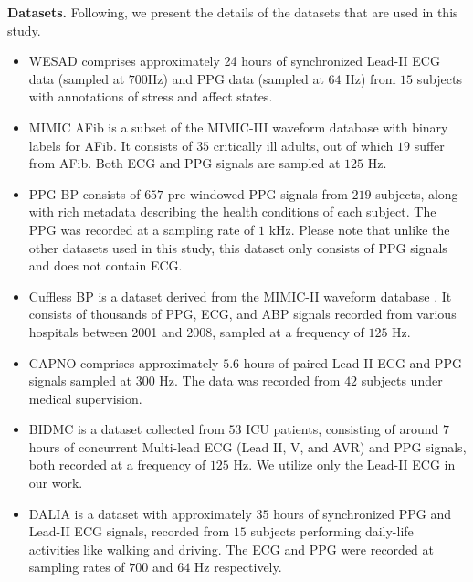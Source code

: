 \documentclass[letterpaper]{article} %
\begin{document}
\noindent\textbf{Datasets.} Following, we present the details of the datasets that are used in this study.

\begin{itemize}
    \item WESAD \citep{schmidt2018introducing} comprises approximately 24 hours of synchronized Lead-II ECG data (sampled at $700$Hz) and PPG data (sampled at $64$ Hz) from $15$ subjects with annotations of stress and affect states. %

    \item MIMIC AFib \cite{bashar2019noise} is a subset of the MIMIC-III waveform database \cite{johnson2016mimic} with binary labels for AFib. It consists of $35$ critically ill adults, out of which $19$ suffer from AFib. Both ECG and PPG signals are sampled at $125$ Hz. 

    \item PPG-BP \cite{liang2018new} consists of $657$ pre-windowed PPG signals from $219$ subjects, along with rich metadata describing the health conditions of each subject. The PPG was recorded at a sampling rate of $1$ kHz. Please note that unlike the other datasets used in this study, this dataset only consists of PPG signals and does not contain ECG.  %

    \item Cuffless BP \cite{kachuee2015cuff} is a dataset derived from the MIMIC-II waveform database \cite{saeed2011multiparameter}. It consists of thousands of PPG, ECG, and ABP signals recorded from various hospitals between 2001 and 2008, sampled at a frequency of $125$ Hz. %

    \item CAPNO \citep{karlen2021capnobase} comprises approximately $5.6$ hours of paired Lead-II ECG and PPG signals sampled at $300$ Hz. The data was recorded from $42$ subjects under medical supervision. 
    
    \item BIDMC \citep{pimentel2016toward} is a dataset collected from $53$ ICU patients, consisting of around $7$ hours of concurrent Multi-lead ECG (Lead II, V, and AVR) and PPG signals, both recorded at a frequency of $125$ Hz. We utilize only the Lead-II ECG in our work. 
    
    \item DALIA \citep{reiss2019deep} is a dataset with approximately $35$ hours of synchronized PPG and Lead-II ECG signals, recorded from $15$ subjects performing daily-life activities like walking and driving. The ECG and PPG were recorded at sampling rates of $700$ and $64$ Hz respectively. %

\end{itemize}
\end{document}
